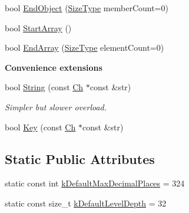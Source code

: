 \begin{Indent}
\begin{DoxyCompactItemize}
\item 
bool \hyperlink{classWriter_a0771a565261564c27676b7300b11f2b5}{End\+Object} (\hyperlink{rapidjson_8h_a5ed6e6e67250fadbd041127e6386dcb5}{Size\+Type} member\+Count=0)
\item 
bool \hyperlink{classWriter_a38715785194b42cd67ba5dd52bf7967e}{Start\+Array} ()
\item 
bool \hyperlink{classWriter_ac88d533095591a878500b63b351d4013}{End\+Array} (\hyperlink{rapidjson_8h_a5ed6e6e67250fadbd041127e6386dcb5}{Size\+Type} element\+Count=0)
\end{DoxyCompactItemize}
\end{Indent}
\begin{Indent}\textbf{ Convenience extensions}\par
\begin{DoxyCompactItemize}
\item 
bool \hyperlink{classWriter_a2a2c6f51644b2013471aec4dac0d7466}{String} (const \hyperlink{classWriter_ab08bff5fd2daec65f4a78779ca3d2139}{Ch} $\ast$const \&str)
\begin{DoxyCompactList}\small\item\em Simpler but slower overload. \end{DoxyCompactList}\item 
bool \hyperlink{classWriter_ab6057b7fa9737edb4da55a7afefa966d}{Key} (const \hyperlink{classWriter_ab08bff5fd2daec65f4a78779ca3d2139}{Ch} $\ast$const \&str)
\end{DoxyCompactItemize}
\end{Indent}
\subsection*{Static Public Attributes}
\begin{DoxyCompactItemize}
\item 
static const int \hyperlink{classWriter_ab46d66ae0ca78cb03ab7fb865d129934}{k\+Default\+Max\+Decimal\+Places} = 324
\item 
static const size\+\_\+t \hyperlink{classWriter_a9cb4caeb9d8971f305edff1d70e67acb}{k\+Default\+Level\+Depth} = 32
\end{DoxyCompactItemize}
